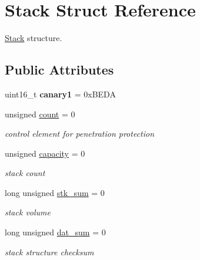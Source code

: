 \hypertarget{struct_stack}{}\section{Stack Struct Reference}
\label{struct_stack}


\hyperlink{struct_stack}{Stack} structure.  


\subsection*{Public Attributes}
\begin{DoxyCompactItemize}
\item 
\mbox{\label{struct_stack_a7361bb8e21c53fc8660de4b91a382a99}} 
uint16\+\_\+t {\bfseries canary1} = 0x\+B\+E\+DA
\item 
\mbox{\label{struct_stack_ae3c965578ef7a6d060e8178346d519d4}} 
unsigned \hyperlink{struct_stack_ae3c965578ef7a6d060e8178346d519d4}{count} = 0
\begin{DoxyCompactList}\small\item\em control element for penetration protection \end{DoxyCompactList}\item 
\mbox{\label{struct_stack_a0c2c0c7f1d93b40c1dca5e6c104a029e}} 
unsigned \hyperlink{struct_stack_a0c2c0c7f1d93b40c1dca5e6c104a029e}{capacity} = 0
\begin{DoxyCompactList}\small\item\em stack count \end{DoxyCompactList}\item 
\mbox{\label{struct_stack_ae78a95cf617c377a5f12d556d2b620e3}} 
long unsigned \hyperlink{struct_stack_ae78a95cf617c377a5f12d556d2b620e3}{stk\+\_\+sum} = 0
\begin{DoxyCompactList}\small\item\em stack volume \end{DoxyCompactList}\item 
\mbox{\label{struct_stack_a0c78ec8c4ec1de7a2a49f210a05031e4}} 
long unsigned \hyperlink{struct_stack_a0c78ec8c4ec1de7a2a49f210a05031e4}{dat\+\_\+sum} = 0
\begin{DoxyCompactList}\small\item\em stack structure checksum \end{DoxyCompactList}\item 

\end{DoxyCompactItemize}
